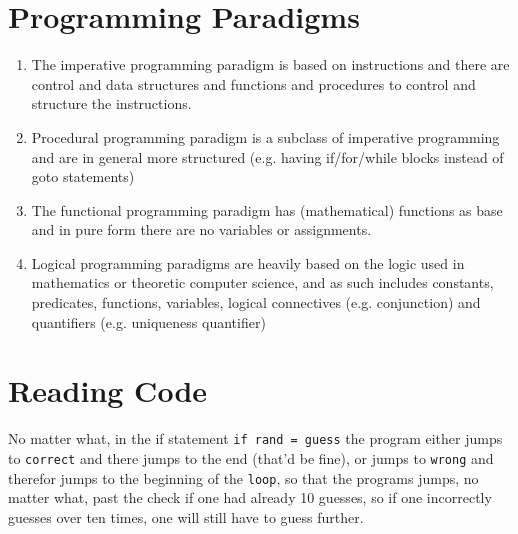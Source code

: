 \documentclass[sectionformat = exercise]{gadsescript}
\begin{document}
\maketitle
\section{Programming Paradigms}
\begin{enumerate}[label=\alph*)]
	\item The imperative programming paradigm is based on instructions and there are control and data structures and functions and procedures to control and structure the instructions.
	\item Procedural programming paradigm is a subclass of imperative programming and are in general more structured (e.g. having if/for/while blocks instead of goto statements)
	\item The functional programming paradigm has (mathematical) functions as base and in pure form there are no variables or assignments.
	\item Logical programming paradigms are heavily based on the logic used in mathematics or theoretic computer science, and as such includes constants, predicates, functions, variables, logical connectives (e.g. conjunction) and quantifiers (e.g. uniqueness quantifier) 
\end{enumerate}

\section{Reading Code}
No matter what, in the if statement \texttt{if rand = guess} the program either jumps to \texttt{correct} and there jumps to the end (that'd be fine), or jumps to \texttt{wrong} and therefor jumps to the beginning of the \texttt{loop}, so that the programs jumps, no matter what, past the check if one had already 10 guesses, so if one incorrectly guesses over ten times, one will still have to guess further.
\end{document}
